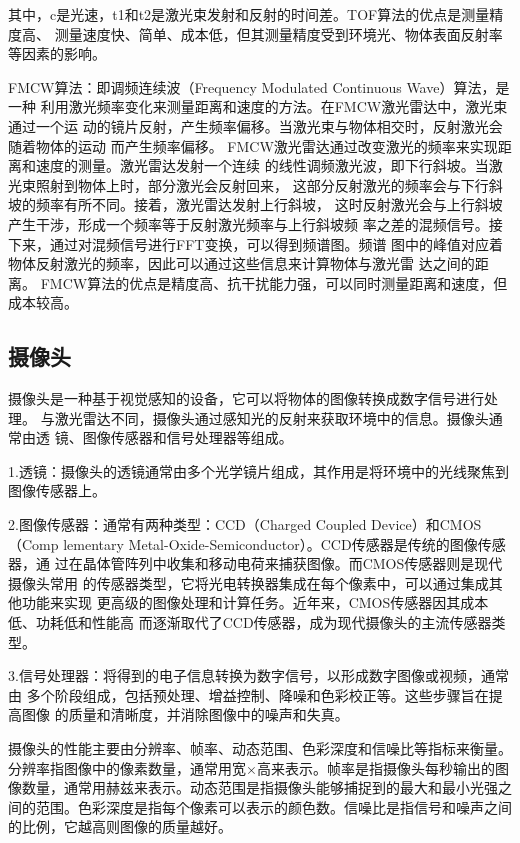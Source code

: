 其中，c是光速，t1和t2是激光束发射和反射的时间差。TOF算法的优点是测量精度高、
测量速度快、简单、成本低，但其测量精度受到环境光、物体表面反射率等因素的影响。


FMCW算法：即调频连续波（Frequency Modulated Continuous Wave）算法，是一种
利用激光频率变化来测量距离和速度的方法。在FMCW激光雷达中，激光束通过一个运
动的镜片反射，产生频率偏移。当激光束与物体相交时，反射激光会随着物体的运动
而产生频率偏移。
FMCW激光雷达通过改变激光的频率来实现距离和速度的测量。激光雷达发射一个连续
的线性调频激光波，即下行斜坡。当激光束照射到物体上时，部分激光会反射回来，
这部分反射激光的频率会与下行斜坡的频率有所不同。接着，激光雷达发射上行斜坡，
这时反射激光会与上行斜坡产生干涉，形成一个频率等于反射激光频率与上行斜坡频
率之差的混频信号。接下来，通过对混频信号进行FFT变换，可以得到频谱图。频谱
图中的峰值对应着物体反射激光的频率，因此可以通过这些信息来计算物体与激光雷
达之间的距离。
FMCW算法的优点是精度高、抗干扰能力强，可以同时测量距离和速度，但成本较高。

\subsection{摄像头}
摄像头是一种基于视觉感知的设备，它可以将物体的图像转换成数字信号进行处理。
与激光雷达不同，摄像头通过感知光的反射来获取环境中的信息。摄像头通常由透
镜、图像传感器和信号处理器等组成。

1.透镜：摄像头的透镜通常由多个光学镜片组成，其作用是将环境中的光线聚焦到
图像传感器上。

2.图像传感器：通常有两种类型：CCD（Charged Coupled Device）和CMOS（Comp
lementary Metal-Oxide-Semiconductor）。CCD传感器是传统的图像传感器，通
过在晶体管阵列中收集和移动电荷来捕获图像。而CMOS传感器则是现代摄像头常用
的传感器类型，它将光电转换器集成在每个像素中，可以通过集成其他功能来实现
更高级的图像处理和计算任务。近年来，CMOS传感器因其成本低、功耗低和性能高
而逐渐取代了CCD传感器，成为现代摄像头的主流传感器类型。

3.信号处理器：将得到的电子信息转换为数字信号，以形成数字图像或视频，通常由
多个阶段组成，包括预处理、增益控制、降噪和色彩校正等。这些步骤旨在提高图像
的质量和清晰度，并消除图像中的噪声和失真。

摄像头的性能主要由分辨率、帧率、动态范围、色彩深度和信噪比等指标来衡量。
分辨率指图像中的像素数量，通常用宽×高来表示。帧率是指摄像头每秒输出的图
像数量，通常用赫兹来表示。动态范围是指摄像头能够捕捉到的最大和最小光强之
间的范围。色彩深度是指每个像素可以表示的颜色数。信噪比是指信号和噪声之间
的比例，它越高则图像的质量越好。

